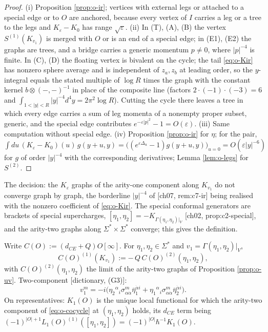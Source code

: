 \begin{proof}
(i) Proposition \ref{prop:o-ir}; vertices with external legs or attached to a special edge or to $O$ are anchored, because every vertex of $I$ carries a leg or a tree to the legs and $K_\varepsilon-K_0$ has range $\sqrt\varepsilon$. (ii) In (T), (A), (B) the vertex $S^{(1)}(K_{v_1})$ is merged with $O$ or is an end of a special edge; in (E1), (E2) the graphs are trees, and a bridge carries a generic momentum $p\neq0$, where $|p|^{-4}$ is finite. In (C), (D) the floating vertex is bivalent on the cycle; the tail \eqref{eq:o-Kir} has nonzero sphere average and is independent of $z_a,z_b$ at leading order, so the $y$-integral equals the stated multiple of $\log R$ times the graph with the constant kernel $b\otimes(-,-)^{-1}$ in place of the composite line (factors $2\cdot(-1)\cdot(-3)=6$ and $\int_{1<|y|<R}|y|^{-4}d^4y=2\pi^2\log R$). Cutting the cycle there leaves a tree in which every edge carries a sum of leg momenta of a nonempty proper subset, generic, and the special edge contributes $e^{-\varepsilon|p|^2}-1=O(\varepsilon)$. (iii) Same computation without special edge. (iv) Proposition \ref{prop:o-ir} for $\eta$; for the pair, $\int du\,(K_\varepsilon-K_0)(u)\,g(y+u,y)=\big((e^{\varepsilon\Delta_u}-1)g(y+u,y)\big)_{u=0}=O(\varepsilon|y|^{-6})$ for $g$ of order $|y|^{-4}$ with the corresponding derivatives; Lemma \ref{lem:o-legs} for $S^{(2)}$.
\end{proof}

The decision: the $K_\varepsilon$ graphs of the arity-one component along $K_{v_1}$ do not converge graph by graph, the borderline $|y|^{-4}$ of [ch07, rem:c7-ir] being realised with the nonzero coefficient of \eqref{eq:o-Kir}. The special conformal generators are brackets of special supercharges, $[\eta_1,\eta_2]=-K_{\Gamma(\eta_1,\eta_2)|_V}$ [ch02, prop:c2-special], and the arity-two graphs along $\Sigma^*\times\Sigma^*$ converge; this gives the definition.

\begin{definition}
\label{def:o-K}
Write $C(O):=(d_{CE}+Q)O[\infty]$. For $\eta_1,\eta_2\in\Sigma^*$ and $v_1=\Gamma(\eta_1,\eta_2)|_V$,
\begin{equation}
C(O)^{(1)}(K_{v_1}):=-\,Q\,C(O)^{(2)}(\eta_1,\eta_2),
\label{eq:o-Kdef}
\end{equation}
with $C(O)^{(2)}(\eta_1,\eta_2)$ the limit of the arity-two graphs of Proposition \ref{prop:o-uv}. Two-component [dictionary, (G3)]:
\[
v_1^m=-i\big(\eta_2{}^\alpha{}_i\sigma^m_{\alpha\dot\alpha}\bar\eta_1^{\dot\alpha i}+\eta_1{}^\alpha{}_i\sigma^m_{\alpha\dot\alpha}\bar\eta_2^{\dot\alpha i}\big).
\]
On representatives: $K_1(O)$ is the unique local functional for which the arity-two component of \eqref{eq:o-cocycle} at $(\eta_1,\eta_2)$ holds, its $d_{CE}$ term being $(-1)^{|O|+1}L_1(O)^{(1)}([\eta_1,\eta_2])=(-1)^{|O|}\hbar^{-1}K_1(O)$.
\end{definition}


